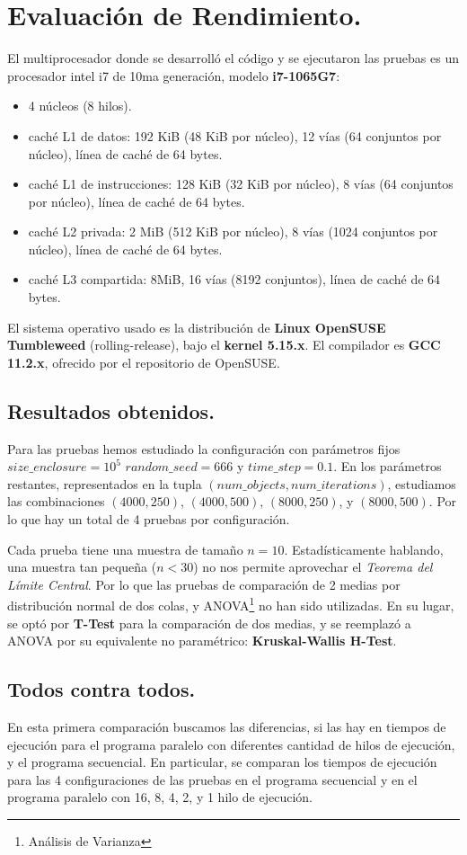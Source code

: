 \documentclass{article}
\begin{document}
\section{Evaluación de Rendimiento.\label{performance}}
El multiprocesador donde se desarrolló el código y se ejecutaron las pruebas es un
procesador intel i7 de 10ma generación, modelo \textbf{i7-1065G7}:
\begin{itemize}
	\item 4 núcleos (8 hilos).
	\item caché L1 de datos: 192 KiB (48 KiB por núcleo), 12 vías (64 conjuntos por núcleo), línea de caché de 64 bytes.
	\item caché L1 de instrucciones: 128 KiB (32 KiB por núcleo), 8 vías (64 conjuntos por núcleo), línea de caché de 64 bytes.
	\item caché L2 privada: 2 MiB (512 KiB por núcleo), 8 vías (1024 conjuntos por núcleo), línea de caché de 64 bytes.
	\item caché L3 compartida: 8MiB, 16 vías (8192 conjuntos), línea de caché de 64 bytes.
\end{itemize}
El sistema operativo usado es la distribución de \textbf{Linux OpenSUSE Tumbleweed} (rolling-release),
bajo el \textbf{kernel 5.15.x}. El compilador es \textbf{GCC 11.2.x}, ofrecido por el repositorio de OpenSUSE.

\subsection{Resultados obtenidos.}
Para las pruebas hemos estudiado la configuración con parámetros fijos ${size\_enclosure}=10^5$ ${random\_seed}=666$ y
${time\_step}=0.1$. En los parámetros restantes, representados en la tupla $({num\_objects}, {num\_iterations})$,
estudiamos las combinaciones $(4000, 250)$, $(4000, 500)$, $(8000, 250)$, y $(8000, 500)$. Por lo que hay
un total de 4 pruebas por configuración.

Cada prueba tiene una muestra de tamaño ${n}=10$. Estadísticamente
hablando, una muestra tan pequeña ($n < 30$) no nos permite aprovechar el \textit{Teorema del Límite Central}.
Por lo que las pruebas de comparación de 2 medias por distribución normal de dos colas, y ANOVA\footnote{Análisis de Varianza}
no han sido utilizadas. En su lugar, se optó por \textbf{T-Test} para la comparación de dos medias, y se reemplazó a ANOVA
por su equivalente no paramétrico: \textbf{Kruskal-Wallis H-Test}.

\subsection{Todos contra todos.\label{kruskal}}
En esta primera comparación buscamos las diferencias, si las hay en tiempos de ejecución para el programa
paralelo con diferentes cantidad de hilos de ejecución, y el programa secuencial. En particular, se comparan
los tiempos de ejecución para las 4 configuraciones de las pruebas en el programa secuencial y en el programa paralelo
con 16, 8, 4, 2, y 1 hilo de ejecución.
\end{document}

